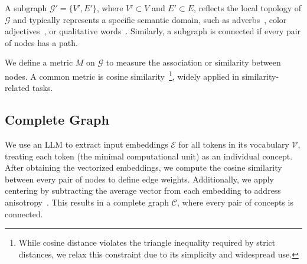 A subgraph $\mathcal{G'} = \{V', E'\}$, where $V' \subset V$ and $E' \subset E$, reflects the local topology of $\mathcal{G}$ and typically represents a specific semantic domain, such as adverbs~\cite{zhang2017semantic}, color adjectives~\cite{gardenfors2014geometry}, or qualitative words~\cite{perrin2010polysemous}. Similarly, a subgraph is connected if every pair of nodes has a path.

We define a metric $M$ on $\mathcal{G}$ to measure the association or similarity between nodes. A common metric is cosine similarity~\footnote{While cosine distance violates the triangle inequality required by strict distances, we relax this constraint due to its simplicity and widespread use.}, widely applied in similarity-related tasks.

\subsection{Complete Graph}

We use an LLM to extract input embeddings $\mathcal{E}$ for all tokens in its vocabulary $\mathcal{V}$, treating each token (the minimal computational unit) as an individual concept. After obtaining the vectorized embeddings, we compute the cosine similarity between every pair of nodes to define edge weights. Additionally, we apply centering by subtracting the average vector from each embedding to address anisotropy~\cite{ethayarajh2019contextual}. This results in a complete graph $\mathcal{C}$, where every pair of concepts is connected.



